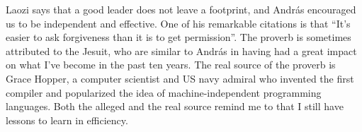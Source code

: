 \documentclass[11pt]{article}
\begin{document}
Laozi says that a good leader does not leave a footprint, and András encouraged
us to be independent and effective. One of his remarkable citations is that
``It's easier to ask forgiveness than it is to get permission''. The proverb is
sometimes attributed to the Jesuit, who are similar to András in having had a
great impact on what I've become in the past ten years. The real source of the
proverb is Grace Hopper, a computer scientist and US navy admiral who invented
the first compiler and popularized the idea of machine-independent programming
languages. Both the alleged and the real source remind me to that I still have
lessons to learn in efficiency.


 
  
\end{document}
